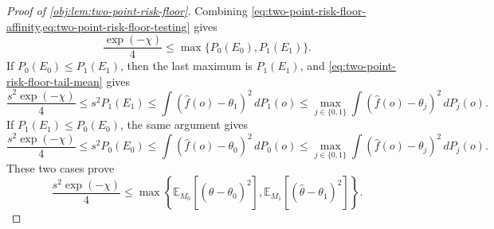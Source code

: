 \begin{proof}[Proof of \cref{obj:lem:two-point-risk-floor}]
Combining \cref{eq:two-point-risk-floor-affinity,eq:two-point-risk-floor-testing} gives
\[
\frac{\exp(-\chi)}{4}\le \max\{P_0(E_0),P_1(E_1)\}.
\]
If \(P_0(E_0)\le P_1(E_1)\), then the last maximum is \(P_1(E_1)\), and \cref{eq:two-point-risk-floor-tail-mean} gives
\[
\frac{s^2\exp(-\chi)}{4}
\le
s^2P_1(E_1)
\le
\int(\widehat f(o)-\theta_1)^2\,dP_1(o)
\le
\max_{j\in\{0,1\}}
\int(\widehat f(o)-\theta_j)^2\,dP_j(o).
\]
If \(P_1(E_1)\le P_0(E_0)\), the same argument gives
\[
\frac{s^2\exp(-\chi)}{4}
\le
s^2P_0(E_0)
\le
\int(\widehat f(o)-\theta_0)^2\,dP_0(o)
\le
\max_{j\in\{0,1\}}
\int(\widehat f(o)-\theta_j)^2\,dP_j(o).
\]
These two cases prove
\begin{equation}\label{eq:two-point-risk-floor-fixed-models}
\frac{s^2\exp(-\chi)}{4}
\le
\max\left\{
\mathbb E_{M_0}\!\left[(\widehat\theta-\theta_0)^2\right],
\mathbb E_{M_1}\!\left[(\widehat\theta-\theta_1)^2\right]
\right\}.
\end{equation} %


\end{proof}

